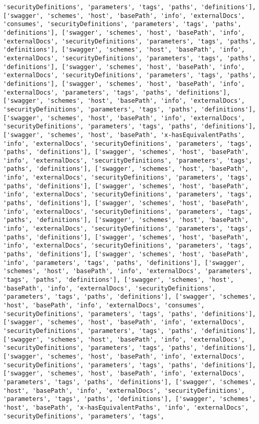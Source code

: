 \documentclass[11pt]{article}
\begin{document}
\begin{Verbatim}[commandchars=\\\{\}]
'securityDefinitions', 'parameters', 'tags', 'paths', 'definitions'], ['swagger', 'schemes', 'host', 'basePath', 'info', 'externalDocs', 'consumes', 'securityDefinitions', 'parameters', 'tags', 'paths', 'definitions'], ['swagger', 'schemes', 'host', 'basePath', 'info', 'externalDocs', 'securityDefinitions', 'parameters', 'tags', 'paths', 'definitions'], ['swagger', 'schemes', 'host', 'basePath', 'info', 'externalDocs', 'securityDefinitions', 'parameters', 'tags', 'paths', 'definitions'], ['swagger', 'schemes', 'host', 'basePath', 'info', 'externalDocs', 'securityDefinitions', 'parameters', 'tags', 'paths', 'definitions'], ['swagger', 'schemes', 'host', 'basePath', 'info', 'externalDocs', 'parameters', 'tags', 'paths', 'definitions'], ['swagger', 'schemes', 'host', 'basePath', 'info', 'externalDocs', 'securityDefinitions', 'parameters', 'tags', 'paths', 'definitions'], ['swagger', 'schemes', 'host', 'basePath', 'info', 'externalDocs', 'securityDefinitions', 'parameters', 'tags', 'paths', 'definitions'], ['swagger', 'schemes', 'host', 'basePath', 'x-hasEquivalentPaths', 'info', 'externalDocs', 'securityDefinitions', 'parameters', 'tags', 'paths', 'definitions'], ['swagger', 'schemes', 'host', 'basePath', 'info', 'externalDocs', 'securityDefinitions', 'parameters', 'tags', 'paths', 'definitions'], ['swagger', 'schemes', 'host', 'basePath', 'info', 'externalDocs', 'securityDefinitions', 'parameters', 'tags', 'paths', 'definitions'], ['swagger', 'schemes', 'host', 'basePath', 'info', 'externalDocs', 'securityDefinitions', 'parameters', 'tags', 'paths', 'definitions'], ['swagger', 'schemes', 'host', 'basePath', 'info', 'externalDocs', 'securityDefinitions', 'parameters', 'tags', 'paths', 'definitions'], ['swagger', 'schemes', 'host', 'basePath', 'info', 'externalDocs', 'securityDefinitions', 'parameters', 'tags', 'paths', 'definitions'], ['swagger', 'schemes', 'host', 'basePath', 'info', 'externalDocs', 'securityDefinitions', 'parameters', 'tags', 'paths', 'definitions'], ['swagger', 'schemes', 'host', 'basePath', 'info', 'parameters', 'tags', 'paths', 'definitions'], ['swagger', 'schemes', 'host', 'basePath', 'info', 'externalDocs', 'parameters', 'tags', 'paths', 'definitions'], ['swagger', 'schemes', 'host', 'basePath', 'info', 'externalDocs', 'securityDefinitions', 'parameters', 'tags', 'paths', 'definitions'], ['swagger', 'schemes', 'host', 'basePath', 'info', 'externalDocs', 'consumes', 'securityDefinitions', 'parameters', 'tags', 'paths', 'definitions'], ['swagger', 'schemes', 'host', 'basePath', 'info', 'externalDocs', 'securityDefinitions', 'parameters', 'tags', 'paths', 'definitions'], ['swagger', 'schemes', 'host', 'basePath', 'info', 'externalDocs', 'securityDefinitions', 'parameters', 'tags', 'paths', 'definitions'], ['swagger', 'schemes', 'host', 'basePath', 'info', 'externalDocs', 'securityDefinitions', 'parameters', 'tags', 'paths', 'definitions'], ['swagger', 'schemes', 'host', 'basePath', 'info', 'externalDocs', 'parameters', 'tags', 'paths', 'definitions'], ['swagger', 'schemes', 'host', 'basePath', 'info', 'externalDocs', 'securityDefinitions', 'parameters', 'tags', 'paths', 'definitions'], ['swagger', 'schemes', 'host', 'basePath', 'x-hasEquivalentPaths', 'info', 'externalDocs', 'securityDefinitions', 'parameters', 'tags', 
\end{Verbatim}
\end{document}
